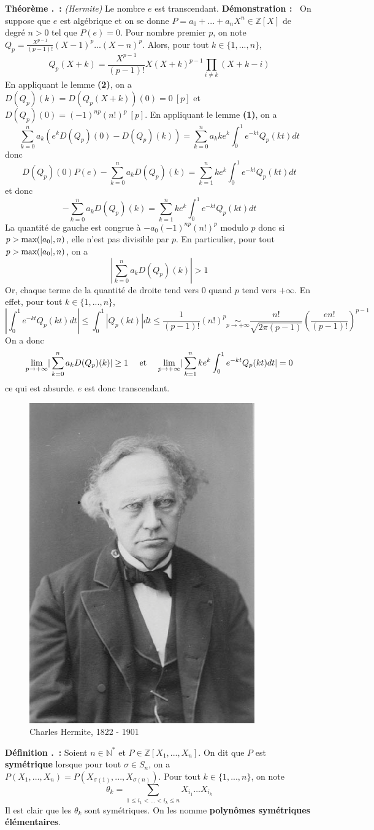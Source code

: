 \documentclass[5pt,a4paper]{article}
\newcounter{defin}[section]
\newcounter{thm}[section]
\renewcommand{\thedefin}{\thesection.\arabic{defin}}
\renewcommand{\thethm}{\thesection.\arabic{thm}}
\newcommand{\defin}[1]{\stepcounter{defin}\noindent\textbf{Définition \thedefin ~:} #1 \newline}
\newcommand{\thm}[1]{\stepcounter{thm}\noindent\textbf{Théorème \thethm ~:} #1 \newline}
\newcommand{\demo}[1]{\textbf{Démonstration :~} #1 \newline}
\begin{document}
\begin{onehalfspacing}
\thm{\textit{(Hermite)} Le nombre $e$ est transcendant.}
\demo{On suppose que $e$ est algébrique et on se donne $P = a_0 + ... + a_nX^n \in \mathbb{Z}[X]$ de degré $n > 0$ tel que $P(e) = 0$. Pour nombre premier $p$, on note $Q_p = \frac{X^{p-1}}{(p-1)!}(X-1)^p...(X-n)^p$. Alors, pour tout $k \in \{1, ..., n\}$,
\[Q_p(X+k) = \frac{X^{p-1}}{(p-1)!}X(X+k)^{p-1}\prod_{i \neq k} (X+k-i)\]
En appliquant le lemme \textbf{(2)}, on a $D(Q_p)(k) = D(Q_p(X+k))(0) = 0~[p]$ et $D(Q_p)(0) = (-1)^{np}(n!)^p~[p]$. En appliquant le lemme \textbf{(1)}, on a
\[\sum_{k=0}^n a_k(e^kD(Q_p)(0) - D(Q_p)(k)) = \sum_{k=0}^n a_kke^k \int_0^1 e^{-kt}Q_p(kt)dt\]
donc 
\[D(Q_p)(0)P(e) - \sum_{k=0}^n a_kD(Q_p)(k) = \sum_{k=1}^n ke^k \int_0^1 e^{-kt}Q_p(kt)dt\]
et donc 
\[- \sum_{k=0}^n a_kD(Q_p)(k) = \sum_{k=1}^n ke^k \int_0^1 e^{-kt}Q_p(kt)dt\]
La quantité de gauche est congrue à $-a_0(-1)^{np}(n!)^p$ modulo $p$ donc si $p > \textup{max}(|a_0|, n)$, elle n'est pas divisible par $p$. En particulier, pour tout $p > \textup{max}(|a_0|, n)$, on a 
\[|\sum_{k=0}^n a_kD(Q_p)(k)| > 1\]
Or, chaque terme de la quantité de droite tend vers 0 quand $p$ tend vers $+\infty$. En effet, pour tout $k \in \{1, ..., n\}$,
\[|\int_0^1 e^{-kt}Q_p(kt)dt| \leq \int_0^1 |Q_p(kt)|dt \leq \frac{1}{(p-1)!}(n!)^p \underset{p \to +\infty}{\sim} \frac{n!}{\sqrt{2\pi(p-1)}}(\frac{en!}{(p-1)!})^{p-1}\]
On a donc 
\[\underset{p \to +\infty}{\textup{lim}} |\sum_{k=0}^n a_kD(Q_p)(k)| \geq 1 ~~~~\textup{et}~~~~ \underset{p \to +\infty}{\textup{lim}} |\sum_{k=1}^n ke^k \int_0^1 e^{-kt}Q_p(kt)dt| = 0\]
ce qui est absurde. $e$ est donc transcendant. }

\begin{figure}[!h]
\centering
\includegraphics[width = 0.33\linewidth]{ressources/hermite.png}
\caption{Charles Hermite, 1822 - 1901}
\end{figure}

\defin{Soient $n \in \mathbb{N}^*$ et $P \in \mathbb{Z}[X_1, ..., X_n]$. On dit que $P$ est \textbf{symétrique} lorsque pour tout $\sigma \in S_n$, on a $P(X_1, ..., X_n) = P(X_{\sigma(1)},..., X_{\sigma(n)})$. Pour tout $k \in \{1, ..., n\}$, on note
\[\theta_k = \sum_{1 \leq i_1 < ... < i_k \leq n} X_{i_1}...X_{i_k}\]
Il est clair que les $\theta_k$ sont symétriques. On les nomme \textbf{ polynômes symétriques élémentaires}.}



\end{onehalfspacing}
\end{document}

